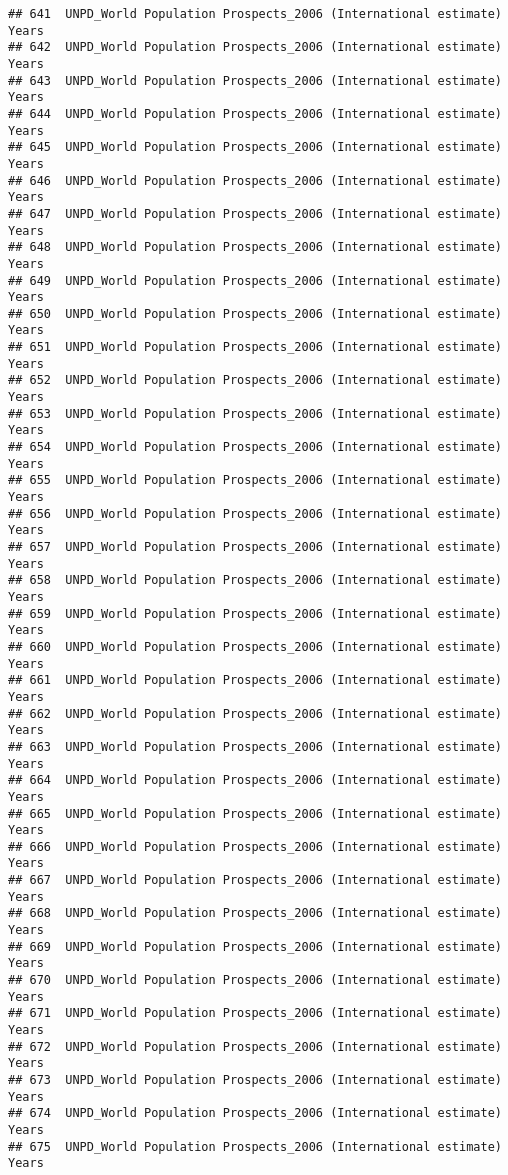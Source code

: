 \documentclass[]{article}
\begin{document}
\begin{verbatim}
## 641  UNPD_World Population Prospects_2006 (International estimate) Years
## 642  UNPD_World Population Prospects_2006 (International estimate) Years
## 643  UNPD_World Population Prospects_2006 (International estimate) Years
## 644  UNPD_World Population Prospects_2006 (International estimate) Years
## 645  UNPD_World Population Prospects_2006 (International estimate) Years
## 646  UNPD_World Population Prospects_2006 (International estimate) Years
## 647  UNPD_World Population Prospects_2006 (International estimate) Years
## 648  UNPD_World Population Prospects_2006 (International estimate) Years
## 649  UNPD_World Population Prospects_2006 (International estimate) Years
## 650  UNPD_World Population Prospects_2006 (International estimate) Years
## 651  UNPD_World Population Prospects_2006 (International estimate) Years
## 652  UNPD_World Population Prospects_2006 (International estimate) Years
## 653  UNPD_World Population Prospects_2006 (International estimate) Years
## 654  UNPD_World Population Prospects_2006 (International estimate) Years
## 655  UNPD_World Population Prospects_2006 (International estimate) Years
## 656  UNPD_World Population Prospects_2006 (International estimate) Years
## 657  UNPD_World Population Prospects_2006 (International estimate) Years
## 658  UNPD_World Population Prospects_2006 (International estimate) Years
## 659  UNPD_World Population Prospects_2006 (International estimate) Years
## 660  UNPD_World Population Prospects_2006 (International estimate) Years
## 661  UNPD_World Population Prospects_2006 (International estimate) Years
## 662  UNPD_World Population Prospects_2006 (International estimate) Years
## 663  UNPD_World Population Prospects_2006 (International estimate) Years
## 664  UNPD_World Population Prospects_2006 (International estimate) Years
## 665  UNPD_World Population Prospects_2006 (International estimate) Years
## 666  UNPD_World Population Prospects_2006 (International estimate) Years
## 667  UNPD_World Population Prospects_2006 (International estimate) Years
## 668  UNPD_World Population Prospects_2006 (International estimate) Years
## 669  UNPD_World Population Prospects_2006 (International estimate) Years
## 670  UNPD_World Population Prospects_2006 (International estimate) Years
## 671  UNPD_World Population Prospects_2006 (International estimate) Years
## 672  UNPD_World Population Prospects_2006 (International estimate) Years
## 673  UNPD_World Population Prospects_2006 (International estimate) Years
## 674  UNPD_World Population Prospects_2006 (International estimate) Years
## 675  UNPD_World Population Prospects_2006 (International estimate) Years

\end{verbatim}
\end{document}
